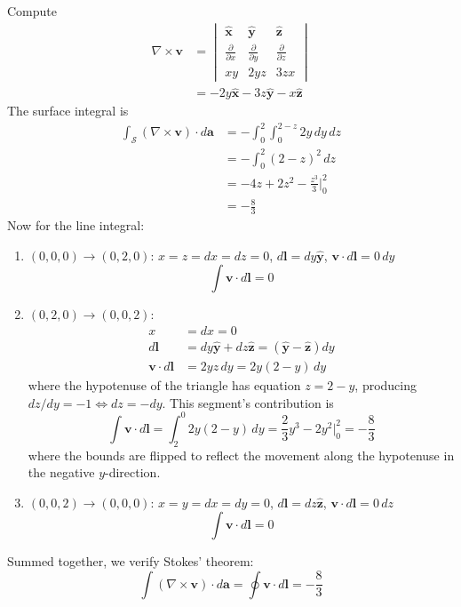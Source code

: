 \documentclass[a4paper]{article}
\begin{document}
Compute
\begin{align*}
	\nabla \times \pmb{v} & = \begin{vmatrix}
		\pmb{\hat{x}} & \pmb{\hat{y}} & \pmb{\hat{z}} \\
		\frac{\partial }{\partial x} & \frac{\partial }{\partial y} & \frac{\partial }{\partial z} \\
		xy & 2yz & 3zx
	\end{vmatrix} \\
	 & = -2y \pmb{\hat{x}} - 3z \pmb{\hat{y}} - x \pmb{\hat{z}}
\end{align*}
The surface integral is
\begin{align*}
	\int_{\mathcal{S}} \!\left( \nabla \times \pmb{v} \right) \cdot d \pmb{a} & = -\int^{2}_{0} \int^{2 - z}_{0} 2y \, dy \, dz \\
										  & = -\int^{2}_{0} \!\left( 2 - z \right)^{2} \, dz \\
										  & = -4z + 2z^{2} - \frac{z^{3}}{3} \Big|^{2}_{0} \\
										  & = -\frac{8}{3}
\end{align*}
Now for the line integral:
\begin{enumerate}[label=(\roman*)]
	\item \underline{\( \!\left( 0,0,0 \right) \rightarrow \!\left( 0,2,0 \right) \)}: \( x = z = dx = dz = 0 \), \( d \pmb{l} = dy \pmb{\hat{y}} \), \( \pmb{v} \cdot d \pmb{l} = 0 \, dy \)
	\[
		\int \pmb{v} \cdot d \pmb{l} = 0
	\]
	\item \underline{\( \!\left( 0,2,0 \right) \rightarrow \!\left( 0,0,2 \right) \)}: 
	\begin{align*}
		x & = dx = 0 \\ 
		d \pmb{l} & = dy \pmb{\hat{y}} + dz \pmb{\hat{z}} = \!\left( \pmb{\hat{y}} - \pmb{\hat{z}} \right)dy \\
		\pmb{v} \cdot d \pmb{l} & = 2yz \, dy = 2y \!\left( 2 - y \right) \, dy
	\end{align*}
	where the hypotenuse of the triangle has equation \( z = 2 - y \), producing \( dz / dy = -1 \iff dz = -dy \). This segment's contribution is
	\[
		\int \pmb{v} \cdot d \pmb{l} = \int^{0}_{2} 2y \!\left( 2 - y \right) \, dy = \frac{2}{3}y^{3} - 2y^{2} \Big|^{2}_{0} = -\frac{8}{3}  
	\]
	where the bounds are flipped to reflect the movement along the hypotenuse in the negative \( y \)-direction.
	\item \underline{\( \!\left( 0,0,2 \right) \rightarrow \!\left( 0,0,0 \right) \)}: \( x = y = dx = dy = 0 \), \( d \pmb{l} = dz \pmb{\hat{z}} \), \( \pmb{v} \cdot d \pmb{l} = 0 \, dz \)
	\[
		\int \pmb{v} \cdot d \pmb{l} = 0 
	\]
\end{enumerate}
Summed together, we verify Stokes' theorem:
\[
	\int \!\left( \nabla \times \pmb{v} \right) \cdot d \pmb{a} = \oint \pmb{v} \cdot d \pmb{l} = -\frac{8}{3} 
\]
\end{document}
